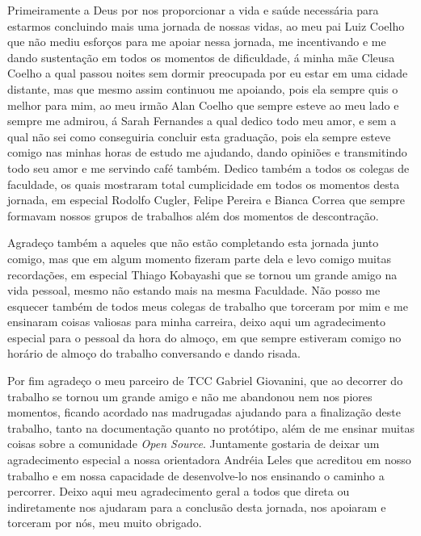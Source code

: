 \begin{agradecimentos}
Primeiramente a Deus por nos proporcionar a vida e saúde necessária para estarmos concluindo mais uma jornada de nossas vidas, ao meu pai Luiz Coelho que não mediu esforços para me apoiar nessa jornada, me incentivando e me dando sustentação em todos os momentos de dificuldade, á minha mãe Cleusa Coelho a qual passou noites sem dormir preocupada por eu estar em uma cidade distante, mas que mesmo assim continuou me apoiando, pois ela sempre quis o melhor para mim, ao meu irmão Alan Coelho que sempre esteve ao meu lado e sempre me admirou, á Sarah Fernandes a qual dedico todo meu amor, e sem a qual não sei como conseguiria concluir esta graduação, pois ela sempre esteve comigo nas minhas horas de estudo me ajudando, dando opiniões e transmitindo todo seu amor e me servindo café também. Dedico também a todos os colegas de faculdade, os quais mostraram total cumplicidade em todos os momentos desta jornada, em especial Rodolfo Cugler, Felipe Pereira e Bianca Correa que sempre formavam nossos grupos de trabalhos além dos momentos de descontração.

Agradeço também a aqueles que não estão completando esta jornada junto comigo, mas que em algum momento fizeram parte dela e levo comigo muitas recordações, em especial Thiago Kobayashi que se tornou um grande amigo na vida pessoal, mesmo não estando mais na mesma Faculdade. Não posso me esquecer também de todos meus colegas de trabalho que torceram por mim e me ensinaram coisas valiosas para minha carreira, deixo aqui um agradecimento especial para o pessoal da hora do almoço, em que sempre estiveram comigo no horário de almoço do trabalho conversando e dando risada.

Por fim agradeço o meu parceiro de TCC Gabriel Giovanini, que ao decorrer do trabalho se tornou um grande amigo e não me abandonou nem nos piores momentos, ficando acordado nas madrugadas ajudando para a finalização deste trabalho, tanto na documentação quanto no protótipo, além de me ensinar muitas coisas sobre a comunidade \textit{Open Source}. Juntamente gostaria de deixar um agradecimento especial a nossa orientadora Andréia Leles que acreditou em nosso trabalho e em nossa capacidade de desenvolve-lo nos ensinando o caminho a percorrer. Deixo aqui meu agradecimento geral a todos que direta ou indiretamente nos ajudaram para a conclusão desta jornada, nos apoiaram e torceram por nós, meu muito obrigado.
\end{agradecimentos}